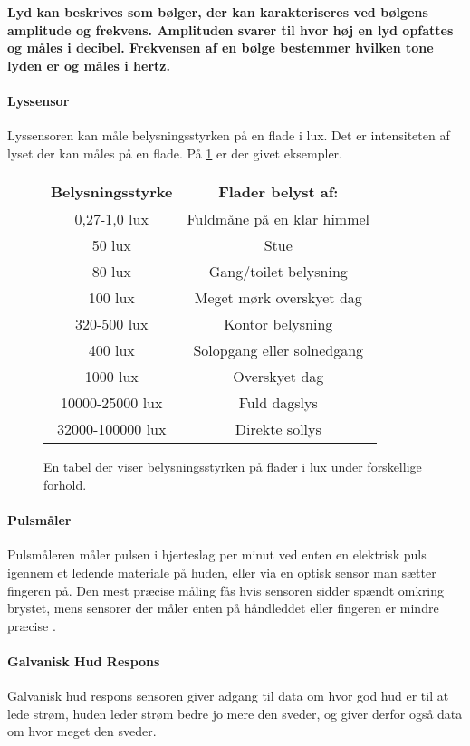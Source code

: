 \textbf{Lyd kan beskrives som bølger, der kan karakteriseres ved bølgens amplitude og frekvens.
Amplituden svarer til hvor høj en lyd opfattes og måles i decibel.
Frekvensen af en bølge bestemmer hvilken tone lyden er og måles i hertz. \cite{sound}}


\paragraph{Lyssensor}
Lyssensoren kan måle belysningsstyrken på en flade i lux. Det er intensiteten af lyset der kan måles på en flade. På \cref{fig:lux} er der givet eksempler.

\begin{figure}
\centering
\begin{tabular}{|c|c|}
\hline \textbf{Belysningsstyrke}    & \textbf{Flader belyst af:}\\
\hline 0,27-1,0 lux                 & Fuldmåne på en klar himmel \\
\hline 50 lux                       & Stue \\
\hline 80 lux                       & Gang/toilet belysning \\
\hline 100 lux                      & Meget mørk overskyet dag \\
\hline 320-500 lux                  & Kontor belysning \\
\hline 400 lux                      & Solopgang eller solnedgang \\
\hline 1000 lux                     & Overskyet dag \\
\hline 10000-25000 lux              & Fuld dagslys \\
\hline 32000-100000 lux             & Direkte sollys\\ \hline
\end{tabular}
\caption{En tabel der viser belysningsstyrken på flader i lux under forskellige forhold. \citep{misc:lux}}
\label{fig:lux}
\end{figure}


\paragraph{Pulsmåler}
Pulsmåleren måler pulsen i hjerteslag per minut ved enten en elektrisk puls igennem et ledende materiale på huden, eller via en optisk sensor man sætter fingeren på.
Den mest præcise måling fås hvis sensoren sidder spændt omkring brystet, mens sensorer der måler enten på håndleddet eller fingeren er mindre præcise \cite{burke1998precision}.

\paragraph{Galvanisk Hud Respons}
Galvanisk hud respons sensoren giver adgang til data om hvor god hud er til at lede strøm, huden leder strøm bedre jo mere den sveder, og giver derfor også data om hvor meget den sveder.